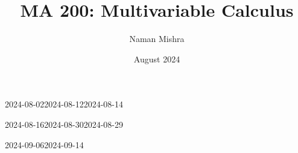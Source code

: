 \documentclass[12pt]{report}
\title{MA 200: Multivariable Calculus}
\author{Naman Mishra}
\date{August 2024}
\begin{document}
\maketitle
\tableofcontents
\newpage
\listoflecture
\listofhw
    
    
    
    
    \small{}
        {2024-08-02}{2024-08-12}{2024-08-14}\normalsize
    
    
    
    
    
    
    \small{}
        {2024-08-16}{2024-08-30}{2024-08-29}\normalsize
    
    
    
    
    
    
    
    \small{}
        {2024-09-06}{2024-09-14}{}\normalsize
\end{document}
